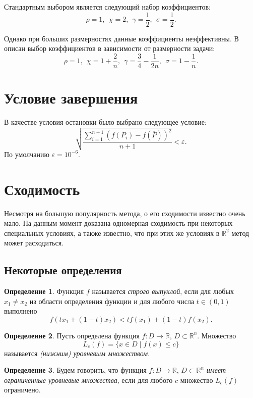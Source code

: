 \documentclass[12pt]{article}
\theoremstyle{plain}
\theoremstyle{remark}
\theoremstyle{definition}
\newtheorem{definition}{Определение}
\begin{document}
Стандартным выбором является следующий набор коэффициентов:
\[ 
\rho = 1,\  \ \chi = 2,\ \ \gamma = \frac12,\ \ \sigma = \frac12.
\]

Однако при больших размерностях данные коэффициенты неэффективны. В \cite{highdimensions} описан выбор коэффициентов в зависимости от размерности задачи:
\[
\rho = 1,\ \ \chi = 1 + \frac2n,\ \ \gamma = \frac34 - \frac{1}{2n},\ \ \sigma = 1 - \frac1n.
\]

\section{Условие завершения}

В качестве условия остановки было выбрано следующее условие:
\[
\sqrt{\frac{\sum_{i = 1}^{n + 1} \left(f(P_i) - f(\overline{P})\right) ^ 2}{n + 1}} < \varepsilon.
\]
По умолчанию $\varepsilon = 10^{-6}$. 


\section{Сходимость}
Несмотря на большую популярность метода, о его сходимости известно очень мало. На данным момент доказана одномерная сходимость при некоторых специальных условиях, а также известно, что при этих же условиях в $\mathbb{R}^2$ метод может расходиться.


\subsection{Некоторые определения}

\begin{definition}
Функция $f$ называется \emph{строго выпуклой}, если для любых $x_1 \ne x_2$ из области определения функции и для любого числа $t \in \left( 0, 1 \right)$ выполнено
\[
f(tx_1 + (1 - t)x_2) < tf(x_1) + (1 - t)f(x_2).
\]
\end{definition}

\begin{definition}
Пусть определена функция $f: D \to \mathbb{R} $, $D \subset \mathbb{R}^n$. Множество 
\[
L_{c}(f) = \{x \in D \mid f(x) \le c \}
\] называется \emph{(нижним) уровневым множеством}.
\end{definition}

\begin{definition}
Будем говорить, что функция $f: D \to \mathbb{R} $, $D \subset \mathbb{R}^n$ \emph{имеет ограниченные уровневые множества}, если для любого $c$ множество $L_{c}(f)$  ограничено.
\end{definition}
\end{document}
